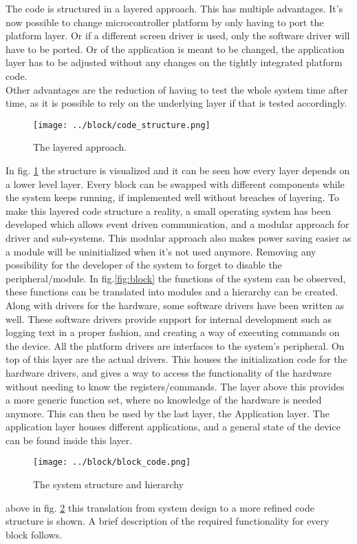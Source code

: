 The code is structured in a layered approach. This has multiple advantages. It's now possible to change microcontroller platform by only having to port the platform layer. Or if a different screen driver is used, only the software driver will have to be ported. Or of the application is meant to be changed, the application layer  has to be adjusted without any changes on the tightly integrated platform code.\\
Other advantages are the reduction of having to test the whole system time after time, as it is possible to rely on the underlying layer if that is tested accordingly.\\
\begin{figure}[H]
	\centering
	\label{fig:code_structure}
	\texttt{[image: ../block/code\_structure.png]}
	\caption{The layered approach.}
\end{figure}
In fig. \ref{fig:code_structure} the structure is visualized and it can be seen how every layer depends on a lower level layer. Every block can be swapped with different components while the system keeps running, if implemented well without breaches of layering.\newpar
To make this layered code structure a reality, a small operating system has been developed which allows event driven communication, and a modular approach for driver and sub-systems. This modular approach also makes power saving easier as a module will be uninitialized when it's not used anymore. Removing any possibility for the developer of the system to forget to disable the peripheral/module.\newpar
In fig.\ref{fig:block} the functions of the system can be observed, these functions can be translated into modules and a hierarchy can be created. Along with drivers for the hardware, some software drivers have been written as well. These software drivers provide support for internal development such as logging text in a proper fashion, and creating a way of executing commands on the device. All the platform drivers are interfaces to the system's peripheral. On top of this layer are the actual drivers. This houses the initialization code for the hardware drivers, and gives a way to access the functionality of the hardware without needing to know the registers/commands. The layer above this provides a more generic function set, where no knowledge of the hardware is needed anymore. This can then be used by the last layer, the Application layer. The application layer houses different applications, and a general state of the device can be found inside this layer.
\begin{figure}[H]
	\centering
	\label{fig:block_code}
	\texttt{[image: ../block/block\_code.png]}
	\caption{The system structure and hierarchy}
\end{figure}
above in fig. \ref{fig:block_code} this translation from system design to a more refined code structure is shown. A brief description of the required functionality for every block follows. 
